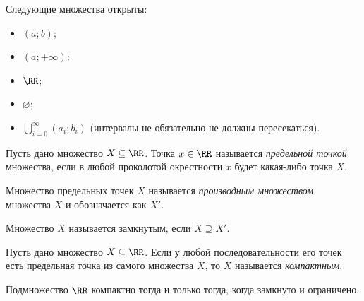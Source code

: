 \documentclass[12pt,a4paper]{article}
\begin{document}
    \begin{example}
        Следующие множества открыты:
        \begin{itemize}
            \item $(a; b)$;
            \item $(a; +\infty)$;
            \item $\RR$;
            \item $\varnothing$;
            \item $\bigcup_{i=0}^\infty (a_i; b_i)$ (интервалы не обязательно не должны пересекаться).
        \end{itemize}
    \end{example}

    \begin{definition}
        Пусть дано множество $X\subseteq \RR$. Точка $x \in \RR$ называется \emph{предельной точкой} множества, если в любой проколотой окрестности $x$ будет какая-либо точка $X$.
        
        Множество предельных точек $X$ называется \emph{производным множеством} множества $X$ и обозначается как $X'$.

        Множество $X$ называется замкнутым, если $X \supseteq X'$.
    \end{definition}

    \begin{definition}
        Пусть дано множество $X\subseteq \RR$. Если у любой последовательности его точек есть предельная точка из самого множества $X$, то $X$ называется \emph{компактным}.
    \end{definition}

    \begin{theorem}
        Подмножество $\RR$ компактно тогда и только тогда, когда замкнуто и ограничено.
    \end{theorem}
\end{document}
